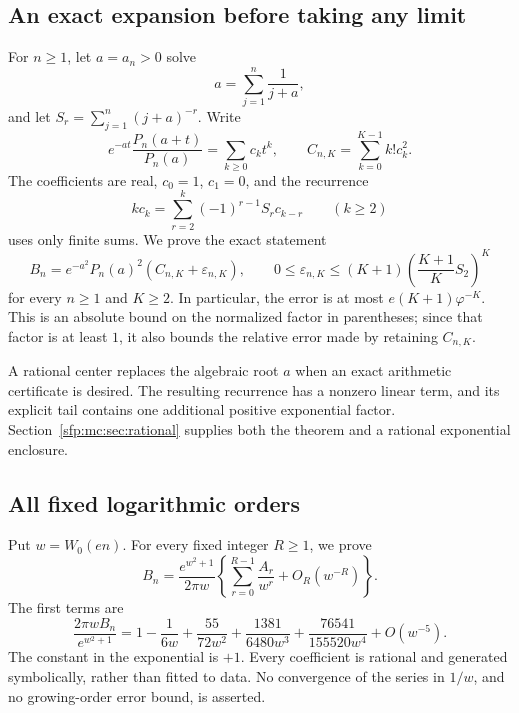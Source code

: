 \documentclass[11pt,letterpaper]{article}
\numberwithin{equation}{section}
\theoremstyle{definition}\newtheorem{definition}[theorem]{Definition}
\theoremstyle{remark}\newtheorem{remark}[theorem]{Remark}
\begin{document}
\subsection{An exact expansion before taking any limit}
For $n\geq1$, let $a=a_n>0$ solve
\begin{equation}\label{sfp:mc:eq:saddle}
 a=\sum_{j=1}^{n}\frac1{j+a},
\end{equation}
and let $S_r=\sum_{j=1}^{n}(j+a)^{-r}$. Write
\begin{equation}\label{sfp:mc:eq:centerdef}
 e^{-at}\frac{P_n(a+t)}{P_n(a)}=\sum_{k\geq0}c_k t^k,
 \qquad C_{n,K}=\sum_{k=0}^{K-1}k!c_k^2.
\end{equation}
The coefficients are real, $c_0=1$, $c_1=0$, and the recurrence
\begin{equation}\label{sfp:mc:eq:recintro}
 kc_k=\sum_{r=2}^{k}(-1)^{r-1}S_r c_{k-r}\qquad(k\geq2)
\end{equation}
uses only finite sums. We prove the exact statement
\begin{equation}\label{sfp:mc:eq:certificateintro}
 B_n=e^{-a^2}P_n(a)^2(C_{n,K}+\varepsilon_{n,K}),\qquad
 0\leq\varepsilon_{n,K}\leq
 (K+1)\left(\frac{K+1}{K}S_2\right)^K
\end{equation}
for every $n\geq1$ and $K\geq2$. In particular, the error is at most
$e(K+1)\varphi^{-K}$. This is an absolute bound on the normalized
factor in parentheses; since that factor is at least $1$, it also
bounds the relative error made by retaining $C_{n,K}$.

A rational center replaces the algebraic root $a$ when an exact
arithmetic certificate is desired. The resulting recurrence has a
nonzero linear term, and its explicit tail contains one additional
positive exponential factor. Section~\ref{sfp:mc:sec:rational} supplies
both the theorem and a rational exponential enclosure.

\subsection{All fixed logarithmic orders}
Put $w=W_0(en)$. For every fixed integer $R\geq1$, we prove
\begin{equation}\label{sfp:mc:eq:mainintro}
 B_n=\frac{e^{w^2+1}}{2\pi w}
 \left\{\sum_{r=0}^{R-1}\frac{A_r}{w^r}+O_R(w^{-R})\right\}.
\end{equation}
The first terms are
\begin{equation}\label{sfp:mc:eq:firstintro}
 \frac{2\pi wB_n}{e^{w^2+1}}
 =1-\frac1{6w}+\frac{55}{72w^2}
  +\frac{1381}{6480w^3}+\frac{76541}{155520w^4}+O(w^{-5}).
\end{equation}
The constant in the exponential is $+1$. Every coefficient is
rational and generated symbolically, rather than fitted to data.
No convergence of the series in $1/w$, and no growing-order error
bound, is asserted.
\end{document}
